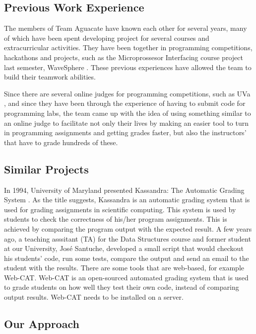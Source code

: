 
\subsection{Previous Work Experience}
The members of Team Aguacate have known each other for several years, many of which have been spent developing project for several courses and extracurricular activities. They have been together in programming competitions, hackathons and projects, such as the Microprossesor Interfacing course project last semester, WaveSphere \cite{Micro2}. These previous experiences have allowed the team to build their teamwork abilities.

Since there are several online judges for programming competitions, such as UVa \cite{UVA}, and since they have been through the experience of having to submit code for programming labs, the team came up with the idea of using something similar to an online judge to facilitate not only their lives by making an easier tool to turn in programming assignments and getting grades faster, but also the instructors' that have to grade hundreds of these.

\subsection{Similar Projects}

In 1994, University of Maryland presented Kassandra: The Automatic Grading System \cite{Matt1994}. As the title suggests, Kassandra is an automatic grading system that is used for grading assignments in scientific computing. This system is used by students to check the correctness of his/her program assignments. This is achieved by comparing the program output with the expected result. A few years ago, a teaching asssitant (TA) for the Data Structures course and former student at our University, José Santuche, developed a small script that would checkout his students' code, run some tests, compare the output and send an email to the student with the results. There are some tools that are web-based, for example Web-CAT. Web-CAT is an open-sourced automated grading system that is used to grade students on how well they test their own code, instead of comparing output results. Web-CAT needs to be installed on a server\cite{WebCat}.

\subsection{Our Approach}

